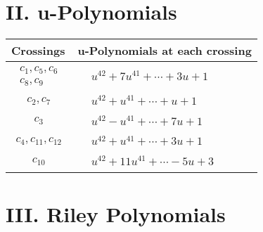\documentclass[1p]{elsarticle_modified}
\theoremstyle{definition}
\begin{document}
\newpage\renewcommand{\arraystretch}{1}
\centering \section*{ II. u-Polynomials}
\begin{tabular}{m{50pt}|m{274pt}}
Crossings & \hspace{64pt}u-Polynomials at each crossing \\
\hline $$\begin{aligned}c_{1},c_{5},c_{6}\\c_{8},c_{9}\end{aligned}$$&$\begin{aligned}
&u^{42}+7 u^{41}+\cdots+3 u+1
\end{aligned}$\\
\hline $$\begin{aligned}c_{2},c_{7}\end{aligned}$$&$\begin{aligned}
&u^{42}+u^{41}+\cdots+u+1
\end{aligned}$\\
\hline $$\begin{aligned}c_{3}\end{aligned}$$&$\begin{aligned}
&u^{42}- u^{41}+\cdots+7 u+1
\end{aligned}$\\
\hline $$\begin{aligned}c_{4},c_{11},c_{12}\end{aligned}$$&$\begin{aligned}
&u^{42}+u^{41}+\cdots+3 u+1
\end{aligned}$\\
\hline $$\begin{aligned}c_{10}\end{aligned}$$&$\begin{aligned}
&u^{42}+11 u^{41}+\cdots-5 u+3
\end{aligned}$\\
\hline
\end{tabular}\newpage\renewcommand{\arraystretch}{1}
\centering \section*{ III. Riley Polynomials}
\end{document}
